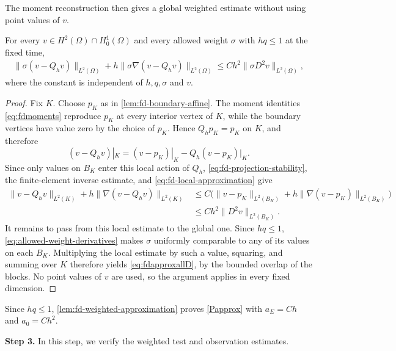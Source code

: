 \documentclass[print,wide,eng]{draft}
\begin{document}
The moment reconstruction then gives a global weighted estimate without using point values of $v$.
%
\begin{lemma}\label{lem:fd-weighted-approximation}
For every $v\in H^2(\Omega)\cap H_0^1(\Omega)$ and every allowed weight $\sigma$ with $hq\leq1$ at the fixed time,
%
\begin{align}\label{eq:fdapproxallD}
\|\sigma(v-Q_hv)\|_{L^2(\Omega)}+h\|\sigma\nabla(v-Q_hv)\|_{L^2(\Omega)}
\leq Ch^2\|\sigma D^2v\|_{L^2(\Omega)},
\end{align}
%
where the constant is independent of $h,q,\sigma$ and $v$.
\end{lemma}
%
%
\begin{proof}
Fix $K$. Choose $p_K$ as in \cref{lem:fd-boundary-affine}. The moment identities \cref{eq:fdmoments} reproduce $p_K$ at every interior vertex of $K$, while the boundary vertices have value zero by the choice of $p_K$. Hence $Q_hp_K=p_K$ on $K$, and therefore\vspace{-2mm}
%
$$
(v-Q_hv)|_K=(v-p_K)|_K-Q_h(v-p_K)|_K.
$$
%
Since only values on $B_K$ enter this local action of $Q_h$, \cref{eq:fd-projection-stability}, the finite-element inverse estimate, and \cref{eq:fd-local-approximation} give\vspace{-2mm}
%
\begin{align*}
\|v-Q_hv\|_{L^2(K)}+h\|\nabla(v-Q_hv)\|_{L^2(K)}
&\le C\bigl(\|v-p_K\|_{L^2(B_K)}
+h\|\nabla(v-p_K)\|_{L^2(B_K)}\bigr)\\
&\le Ch^2\|D^2v\|_{L^2(B_K)}.
\end{align*}
%
It remains to pass from this local estimate to the global one. Since $hq\le1$, \cref{eq:allowed-weight-derivatives} makes $\sigma$ uniformly comparable to any of its values on each $B_K$. Multiplying the local estimate by such a value, squaring, and summing over $K$ therefore yields \cref{eq:fdapproxallD}, by the bounded overlap of the blocks. No point values of $v$ are used, so the argument applies in every fixed dimension.
\end{proof}
%
%

Since $hq\leq1$, \cref{lem:fd-weighted-approximation} proves \cref{Papprox} with $a_E=Ch$ and $a_0=Ch^2$.

\smallskip

{\bf Step 3.}
In this step, we verify the weighted test and observation estimates.
\end{document}
